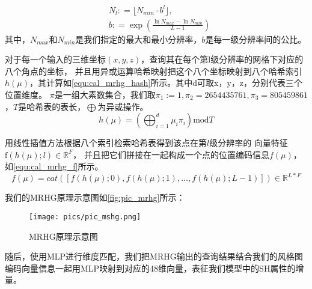 \begin{equation}
    \label{equ:cal_mrhg_res}
    \begin{aligned}&N_l{:}=\lfloor N_{min}\cdot b^l\rfloor,\\&b{:}=\exp{(\frac{\ln N_{max}-\ln N_{min}}{L-1})}\end{aligned}
\end{equation}
其中，\(N_{max}\)和\(N_{min}\)是我们指定的最大和最小分辨率，$b$是每一级分辨率间的公比。
\par 对于每一个输入的三维坐标$(x,y,z)$，查询其在每个第l级分辨率的网格下对应的八个角点的坐标，
并且用异或运算哈希映射把这个八个坐标映射到八个哈希索引$h(\mu)$，其计算如\autoref{equ:cal_mrhg_hash}所示。其中d可取x，y，z，分别代表三个位置维度。
$\pi$是一组大素数集合，我们取\(\pi_{1}:=1,\pi_2=2654435761,\pi_3=805459861\)，$T$是哈希表的表长，$\bigoplus $为异或操作。
\begin{equation}
    \label{equ:cal_mrhg_hash}
    h(\mu)=\left(\bigoplus_{i=1}^d\mu_i\pi_i\right)\mathrm{mod}T
\end{equation}
\par 用线性插值方法根据八个索引检索哈希表得到该点在第$l$级分辨率的
向量特征\(\mathrm{f}(h(\mu);l)
\in\mathbb{R}^F\)，
并且把它们拼接在一起构成一个点的位置编码信息\(f(\mu)\)，
如\autoref{equ:cal_mrhg_f}所示。
\begin{equation}
    \label{equ:cal_mrhg_f}
    f(\mu)=cat([f(h(\mu);0),f(h(\mu);1),\ldots,f(h(\mu);L-1)])\in\mathbb{R}^{L*F}
\end{equation}


我们的MRHG原理示意图如\autoref{fig:pic_mrhg}所示：

\begin{figure}[htb]
    \centering
    \texttt{[image: pics/pic\_mshg.png]}
    \caption{\label{fig:pic_mrhg}MRHG原理示意图}
\end{figure}




随后，使用MLP进行维度匹配，我们把MRHG输出的查询结果结合我们的风格图编码向量信息一起用MLP映射到对应的48维向量，表征我们模型中的SH属性的增量。

